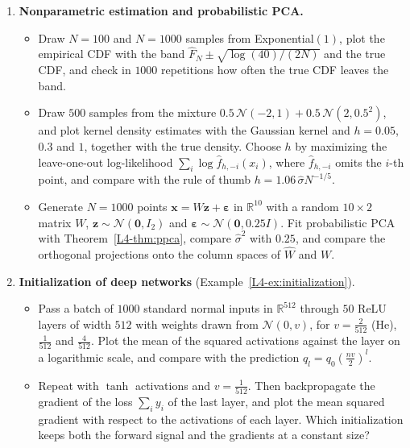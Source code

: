 \begin{enumerate}[label=\textbf{P\arabic*.}, leftmargin=*]
    \item \textbf{Nonparametric estimation and probabilistic PCA.}
    \begin{itemize}
        \item Draw $N = 100$ and $N = 1000$ samples from Exponential$(1)$, plot the empirical CDF with the band $\hat F_N \pm \sqrt{\log(40)/(2N)}$ and the true CDF, and check in $1000$ repetitions how often the true CDF leaves the band.
        \item Draw $500$ samples from the mixture $0.5\,\mathcal{N}(-2, 1) + 0.5\,\mathcal{N}(2, 0.5^2)$, and plot kernel density estimates with the Gaussian kernel and $h = 0.05$, $0.3$ and $1$, together with the true density. Choose $h$ by maximizing the leave-one-out log-likelihood $\sum_i \log\hat f_{h, -i}(x_i)$, where $\hat f_{h, -i}$ omits the $i$-th point, and compare with the rule of thumb $h = 1.06\,\hat\sigma N^{-1/5}$.
        \item Generate $N = 1000$ points $\mathbf{x} = W\mathbf{z} + \boldsymbol{\varepsilon}$ in $\mathbb{R}^{10}$ with a random $10 \times 2$ matrix $W$, $\mathbf{z} \sim \mathcal{N}(\mathbf{0}, I_2)$ and $\boldsymbol{\varepsilon} \sim \mathcal{N}(\mathbf{0}, 0.25I)$. Fit probabilistic PCA with Theorem~\ref{L4-thm:ppca}, compare $\hat\sigma^2$ with $0.25$, and compare the orthogonal projections onto the column spaces of $\hat W$ and $W$.
    \end{itemize}

    \item \textbf{Initialization of deep networks} (Example~\ref{L4-ex:initialization}).
    \begin{itemize}
        \item Pass a batch of $1000$ standard normal inputs in $\mathbb{R}^{512}$ through $50$ ReLU layers of width $512$ with weights drawn from $\mathcal{N}(0, v)$, for $v = \frac{2}{512}$ (He), $\frac{1}{512}$ and $\frac{4}{512}$. Plot the mean of the squared activations against the layer on a logarithmic scale, and compare with the prediction $q_l = q_0(\frac{nv}{2})^l$.
        \item Repeat with $\tanh$ activations and $v = \frac{1}{512}$. Then backpropagate the gradient of the loss $\sum_i y_i$ of the last layer, and plot the mean squared gradient with respect to the activations of each layer. Which initialization keeps both the forward signal and the gradients at a constant size?
    \end{itemize}


\end{enumerate}
